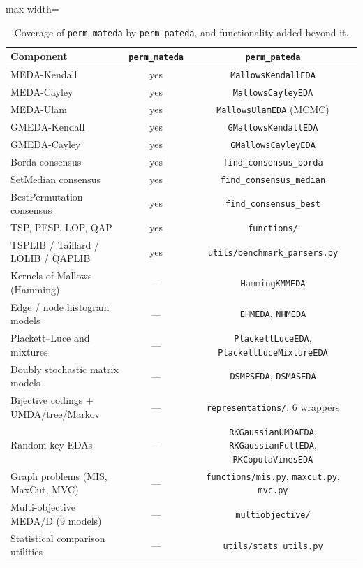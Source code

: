 \documentclass[a4paper,11pt]{article}
\begin{document}
\begin{table}[ht]
\centering
\footnotesize
\setlength{\tabcolsep}{3pt}
\begin{adjustbox}{max width=\textwidth}
\begin{tabular}{p{5.2cm}cc}
\toprule
\textbf{Component} & \textbf{\texttt{perm\_mateda}} & \textbf{\texttt{perm\_pateda}} \\
\midrule
MEDA-Kendall     & yes & \texttt{MallowsKendallEDA} \\
MEDA-Cayley      & yes & \texttt{MallowsCayleyEDA} \\
MEDA-Ulam        & yes & \texttt{MallowsUlamEDA} (MCMC) \\
GMEDA-Kendall    & yes & \texttt{GMallowsKendallEDA} \\
GMEDA-Cayley     & yes & \texttt{GMallowsCayleyEDA} \\
Borda consensus         & yes & \texttt{find\_consensus\_borda} \\
SetMedian consensus     & yes & \texttt{find\_consensus\_median} \\
BestPermutation consensus & yes & \texttt{find\_consensus\_best} \\
TSP, PFSP, LOP, QAP     & yes & \texttt{functions/} \\
TSPLIB / Taillard / LOLIB / QAPLIB & yes & \texttt{utils/benchmark\_parsers.py} \\
\midrule
Kernels of Mallows (Hamming) & --- & \texttt{HammingKMMEDA} \\
Edge / node histogram models & --- & \texttt{EHMEDA}, \texttt{NHMEDA} \\
Plackett--Luce and mixtures & --- & \texttt{PlackettLuceEDA}, \texttt{PlackettLuceMixtureEDA} \\
Doubly stochastic matrix models & --- & \texttt{DSMPSEDA}, \texttt{DSMASEDA} \\
Bijective codings + UMDA/tree/Markov & --- & \texttt{representations/}, 6 wrappers \\
Random-key EDAs & --- & \texttt{RKGaussianUMDAEDA}, \texttt{RKGaussianFullEDA}, \texttt{RKCopulaVinesEDA} \\
Graph problems (MIS, MaxCut, MVC) & --- & \texttt{functions/mis.py}, \texttt{maxcut.py}, \texttt{mvc.py} \\
Multi-objective MEDA/D (9 models) & --- & \texttt{multiobjective/} \\
Statistical comparison utilities & --- & \texttt{utils/stats\_utils.py} \\
\bottomrule
\end{tabular}
\end{adjustbox}
\caption{Coverage of \texttt{perm\_mateda} by \texttt{perm\_pateda}, and
functionality added beyond it.}
\label{tab:coverage}
\end{table}
\end{document}
